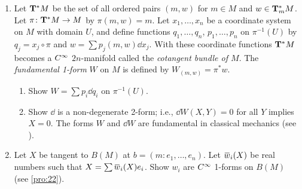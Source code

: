 \documentclass[../main]{subfiles}
\begin{document}
\begin{enumerate}
    \item\label{pro:40} Let $\cotangentbundle{M}$ be the set of all ordered pairs $(m,w)$ for $m \in M$ and $w \in \cotangentspace{M}{m}$. Let $\pi\colon \cotangentbundle{M}\functionMaps M$ by $\pi(m, w) = m$. Let $x_1,\dots,x_n$ be a coordinate system on $M$ with domain $U$, and define functions $q_1,\dots,q_n$, $p_1,\dots,p_n$ on $\pi^{-1}(U)$ by $q_j = x_j \circ \pi$ and $w = \sum p_j(m, w)\dd x_j$. With these coordinate functions $\cotangentbundle{M}$ becomes a $\CInfty$ $2n$-manifold called the \emph{cotangent bundle of $M$}. The \emph{fundamental 1-form} $W$ on $M$ is defined by $W_{(m,w)} = \pi^*w$. 
    \begin{enumerate}
        \item Show $W = \sum p_i\dd q_i$ on $\pi^{-1}(U)$.
        \item Show $\dd $ is a non-degenerate 2-form; i.e., $\dd W(X,Y) = 0$ for all $Y$ implies $X = 0$. The forms $W$ and $\dd W$ are fundamental in classical mechanics (see \cite{mackey2004mathematical}). 
    \end{enumerate}
     
    
    \item\label{pro:41} Let $X$ be tangent to $B(M)$ at $b = (m\colon e_1,\dots,e_n)$. Let $\xoverline w_i(X)$ be real numbers such that $X = \sum \xoverline w_i(X) e_i$. Show $w_i$ are $\CInfty$ 1-forms on $B(M)$ (see \ref{pro:22}).
\end{enumerate}
\end{document}
